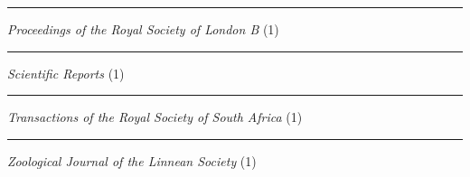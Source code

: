\documentclass[margin,line]{res}
\begin{document}
\begin{resume}
\rule{-1mm}{5mm} \hspace*{4mm} \textit{Proceedings of the Royal Society of London B} (1) \\
\rule{-1mm}{5mm} \hspace*{4mm} \textit{Scientific Reports} (1) \\
\rule{-1mm}{5mm} \hspace*{4mm} \textit{Transactions of the Royal Society of South Africa} (1) \\
\rule{-1mm}{5mm} \hspace*{4mm} \textit{Zoological Journal of the Linnean Society} (1) \\




\end{resume}
\end{document}
